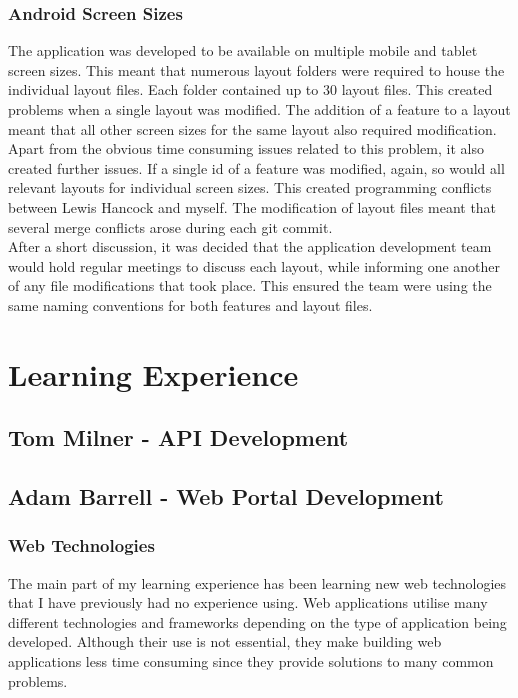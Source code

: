 \documentclass[11pt,a4paper]{report}
\begin{document}
\subsubsection{Android Screen Sizes}

The application was developed to be available on multiple mobile and tablet screen sizes. This meant that numerous layout folders were required to house the individual layout files. Each folder contained up to 30 layout files. This created problems when a single layout was modified. The addition of a feature to a layout meant that all other screen sizes for the same layout also required modification. Apart from the obvious time consuming issues related to this problem, it also created further issues. If a single id of a feature was modified, again, so would all relevant layouts for individual screen sizes. This created programming conflicts between Lewis Hancock and myself. The modification of layout files meant that several merge conflicts arose during each git commit.\\

After a short discussion, it was decided that the application development team would hold regular meetings to discuss each layout, while informing one another of any file modifications that took place. This ensured the team were using the same naming conventions for both features and layout files.

\section{Learning Experience}
\label{sec:learning-experience}
\subsection{Tom Milner - API Development}
\subsection{Adam Barrell - Web Portal Development}

\subsubsection{Web Technologies}
The main part of my learning experience has been learning new web technologies that I have previously had no experience using. Web applications utilise many different technologies and frameworks depending on the type of application being developed. Although their use is not essential, they make building web applications less time consuming since they provide solutions to many common problems.
\end{document}
